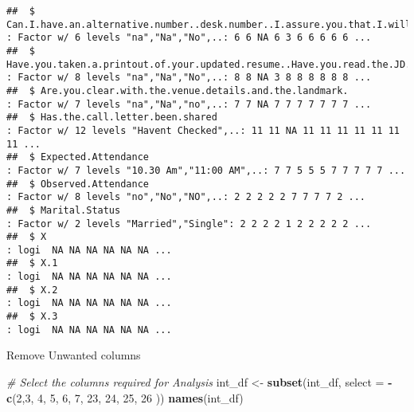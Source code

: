\documentclass[]{article}
\newenvironment{Shaded}{\begin{snugshade}}{\end{snugshade}}
\newcommand{\KeywordTok}[1]{\textcolor[rgb]{0.13,0.29,0.53}{\textbf{#1}}}
\newcommand{\DataTypeTok}[1]{\textcolor[rgb]{0.13,0.29,0.53}{#1}}
\newcommand{\DecValTok}[1]{\textcolor[rgb]{0.00,0.00,0.81}{#1}}
\newcommand{\StringTok}[1]{\textcolor[rgb]{0.31,0.60,0.02}{#1}}
\newcommand{\CommentTok}[1]{\textcolor[rgb]{0.56,0.35,0.01}{\textit{#1}}}
\newcommand{\OperatorTok}[1]{\textcolor[rgb]{0.81,0.36,0.00}{\textbf{#1}}}
\newcommand{\NormalTok}[1]{#1}
\begin{document}
\begin{verbatim}
##  $ Can.I.have.an.alternative.number..desk.number..I.assure.you.that.I.will.not.trouble.you.too.much  : Factor w/ 6 levels "na","Na","No",..: 6 6 NA 6 3 6 6 6 6 6 ...
##  $ Have.you.taken.a.printout.of.your.updated.resume..Have.you.read.the.JD.and.understood.the.same    : Factor w/ 8 levels "na","Na","No",..: 8 8 NA 3 8 8 8 8 8 8 ...
##  $ Are.you.clear.with.the.venue.details.and.the.landmark.                                            : Factor w/ 7 levels "na","Na","no",..: 7 7 NA 7 7 7 7 7 7 7 ...
##  $ Has.the.call.letter.been.shared                                                                   : Factor w/ 12 levels "Havent Checked",..: 11 11 NA 11 11 11 11 11 11 11 ...
##  $ Expected.Attendance                                                                               : Factor w/ 7 levels "10.30 Am","11:00 AM",..: 7 7 5 5 5 7 7 7 7 7 ...
##  $ Observed.Attendance                                                                               : Factor w/ 8 levels "no","No","NO",..: 2 2 2 2 2 7 7 7 7 2 ...
##  $ Marital.Status                                                                                    : Factor w/ 2 levels "Married","Single": 2 2 2 2 1 2 2 2 2 2 ...
##  $ X                                                                                                 : logi  NA NA NA NA NA NA ...
##  $ X.1                                                                                               : logi  NA NA NA NA NA NA ...
##  $ X.2                                                                                               : logi  NA NA NA NA NA NA ...
##  $ X.3                                                                                               : logi  NA NA NA NA NA NA ...
\end{verbatim}

Remove Unwanted columns

\begin{Shaded}
\begin{Highlighting}[]
\CommentTok{# Select the columns required for Analysis}
\NormalTok{int_df <-}\StringTok{ }\KeywordTok{subset}\NormalTok{(int_df, }\DataTypeTok{select =} \OperatorTok{-}\KeywordTok{c}\NormalTok{(}\DecValTok{2}\NormalTok{,}\DecValTok{3}\NormalTok{, }\DecValTok{4}\NormalTok{, }\DecValTok{5}\NormalTok{, }\DecValTok{6}\NormalTok{, }\DecValTok{7}\NormalTok{, }\DecValTok{23}\NormalTok{, }\DecValTok{24}\NormalTok{, }\DecValTok{25}\NormalTok{, }\DecValTok{26}\NormalTok{ ))}
\KeywordTok{names}\NormalTok{(int_df)}
\end{Highlighting}
\end{Shaded}
\end{document}
